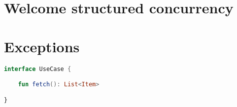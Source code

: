 \documentclass[10pt]{beamer}
\begin{document}
\begin{frame}[fragile]
\begin{lstlisting}[language=Kotlin, basicstyle=\ttfamily]
\end{lstlisting}
\end{frame}


\begin{frame}[fragile]
\begin{lstlisting}[language=Kotlin, basicstyle=\ttfamily]
\end{lstlisting}
\end{frame}



















































\section{Welcome structured concurrency}


\section{Exceptions}




\begin{frame}[fragile]
\begin{lstlisting}[language=Kotlin, basicstyle=\ttfamily]
interface UseCase {

    fun fetch(): List<Item>

}
\end{lstlisting}
\end{frame}
\end{document}
